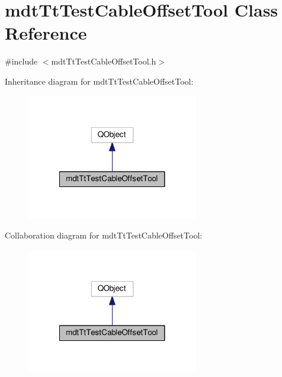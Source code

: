 \hypertarget{classmdt_tt_test_cable_offset_tool}{\section{mdt\-Tt\-Test\-Cable\-Offset\-Tool Class Reference}
\label{classmdt_tt_test_cable_offset_tool}
}


{\ttfamily \#include $<$mdt\-Tt\-Test\-Cable\-Offset\-Tool.\-h$>$}



Inheritance diagram for mdt\-Tt\-Test\-Cable\-Offset\-Tool\-:\nopagebreak
\begin{figure}[H]
\begin{center}
\leavevmode
\includegraphics[width=212pt]{classmdt_tt_test_cable_offset_tool__inherit__graph}
\end{center}
\end{figure}


Collaboration diagram for mdt\-Tt\-Test\-Cable\-Offset\-Tool\-:\nopagebreak
\begin{figure}[H]
\begin{center}
\leavevmode
\includegraphics[width=212pt]{classmdt_tt_test_cable_offset_tool__coll__graph}
\end{center}
\end{figure}
